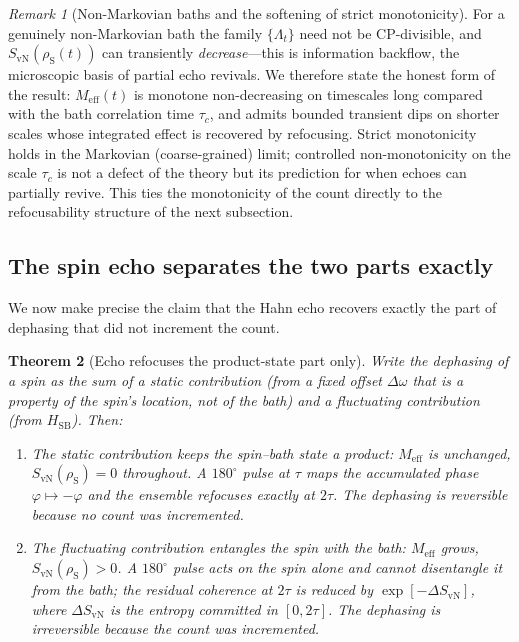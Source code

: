 \documentclass[twocolumn,10pt,a4paper]{article}
\theoremstyle{thmstyle}
\newtheorem{theorem}{Theorem}[section]
\theoremstyle{definition}
\theoremstyle{remark}
\newtheorem{remark}[theorem]{Remark}
\newcommand{\sysrho}{\rho_{\mathrm{S}}}
\newcommand{\Svn}{S_{\mathrm{vN}}}
\newcommand{\Meff}{M_{\mathrm{eff}}}
\begin{document}
\begin{remark}[Non-Markovian baths and the softening of strict
monotonicity]
\label{rem:nonmarkov}
For a genuinely non-Markovian bath the family $\{\Lambda_{t}\}$ need not be
CP-divisible, and $\Svn(\sysrho(t))$ can transiently \emph{decrease}---this
is information backflow, the microscopic basis of partial echo revivals. We
therefore state the honest form of the result: $\Meff(t)$ is monotone
non-decreasing on timescales long compared with the bath correlation time
$\tau_{c}$, and admits bounded transient dips on shorter scales whose
integrated effect is recovered by refocusing. Strict monotonicity holds in
the Markovian (coarse-grained) limit; controlled non-monotonicity on the
scale $\tau_{c}$ is not a defect of the theory but its prediction for when
echoes can partially revive. This ties the monotonicity of the count
directly to the refocusability structure of the next subsection.
\end{remark}

\subsection{The spin echo separates the two parts exactly}

We now make precise the claim that the Hahn echo recovers exactly the part
of dephasing that did not increment the count.

\begin{theorem}[Echo refocuses the product-state part only]
\label{thm:echo-split}
Write the dephasing of a spin as the sum of a static contribution (from a
fixed offset $\Delta\omega$ that is a property of the spin's location, not
of the bath) and a fluctuating contribution (from $H_{\mathrm{SB}}$). Then:
\begin{enumerate}[leftmargin=1.5em,label=(\roman*),itemsep=0.2em]
\item The static contribution keeps the spin--bath state a product:
$\Meff$ is unchanged, $\Svn(\sysrho)=0$ throughout. A $180^{\circ}$ pulse
at $\tau$ maps the accumulated phase $\varphi\mapsto-\varphi$ and the
ensemble refocuses exactly at $2\tau$. The dephasing is reversible because
no count was incremented.
\item The fluctuating contribution entangles the spin with the bath:
$\Meff$ grows, $\Svn(\sysrho)>0$. A $180^{\circ}$ pulse acts on the spin
alone and cannot disentangle it from the bath; the residual coherence at
$2\tau$ is reduced by $\exp[-\Delta\Svn]$, where $\Delta\Svn$ is the
entropy committed in $[0,2\tau]$. The dephasing is irreversible because the
count was incremented.
\end{enumerate}
\end{theorem}
\end{document}
